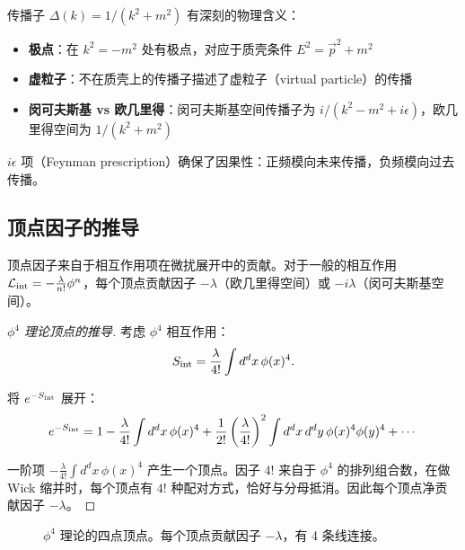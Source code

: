 \begin{remark}[传播子的物理意义]
传播子 $\Delta(k) = 1/(k^2 + m^2)$ 有深刻的物理含义：
\begin{itemize}
    \item \textbf{极点}：在 $k^2 = -m^2$ 处有极点，对应于质壳条件 $E^2 = \vec{p}^2 + m^2$
    \item \textbf{虚粒子}：不在质壳上的传播子描述了虚粒子（virtual particle）的传播
    \item \textbf{闵可夫斯基 vs 欧几里得}：闵可夫斯基空间传播子为 $i/(k^2 - m^2 + i\epsilon)$，欧几里得空间为 $1/(k^2 + m^2)$
\end{itemize}
$i\epsilon$ 项（Feynman prescription）确保了因果性：正频模向未来传播，负频模向过去传播。
\end{remark}


\subsection{顶点因子的推导}

\begin{theorem}[相互作用顶点]
顶点因子来自于相互作用项在微扰展开中的贡献。对于一般的相互作用 $\mathcal{L}_{\rm int} = -\frac{\lambda}{n!}\phi^n$，每个顶点贡献因子 $-\lambda$（欧几里得空间）或 $-i\lambda$（闵可夫斯基空间）。
\end{theorem}

\begin{proof}[$\phi^4$ 理论顶点的推导]
考虑 $\phi^4$ 相互作用：
\begin{equation}
    S_{\rm int} = \frac{\lambda}{4!}\int d^d x \, \phi(x)^4.
\end{equation}

将 $e^{-S_{\rm int}}$ 展开：
\begin{equation}
    e^{-S_{\rm int}} = 1 - \frac{\lambda}{4!}\int d^d x \, \phi(x)^4 + \frac{1}{2!}\left(\frac{\lambda}{4!}\right)^2 \int d^d x \, d^d y \, \phi(x)^4 \phi(y)^4 + \cdots
\end{equation}

一阶项 $-\frac{\lambda}{4!}\int d^d x \, \phi(x)^4$ 产生一个顶点。因子 $4!$ 来自于 $\phi^4$ 的排列组合数，在做 Wick 缩并时，每个顶点有 $4!$ 种配对方式，恰好与分母抵消。因此每个顶点净贡献因子 $-\lambda$。
\end{proof}

\begin{figure}[htbp]
\centering
{}
\caption{$\phi^4$ 理论的四点顶点。每个顶点贡献因子 $-\lambda$，有 4 条线连接。}
\label{fig:vertex}
\end{figure}

